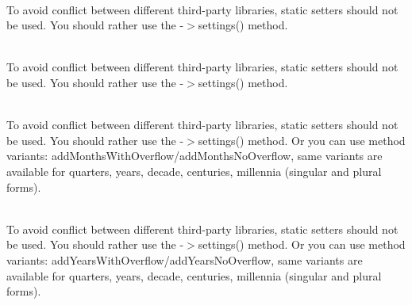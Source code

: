 \begin{DoxyRefList}
\item[Global \doxylink{interface_carbon_1_1_carbon_interface_af30f09ba70e61ee267bee03b2b12ea7c}{Carbon\+Interface\+::disable\+Human\+Diff\+Option} (int \$human\+Diff\+Option)]\hfill \\
\label{deprecated__deprecated000194}%
%
To avoid conflict between different third-\/party libraries, static setters should not be used. You should rather use the -\/\texorpdfstring{$>$}{>}settings() method.  
\item[Global \doxylink{interface_carbon_1_1_carbon_interface_ac7d8c2e90fb7e86be3493973481a1dc0}{Carbon\+Interface\+::enable\+Human\+Diff\+Option} (int \$human\+Diff\+Option)]\hfill \\
\label{deprecated__deprecated000195}%
%
To avoid conflict between different third-\/party libraries, static setters should not be used. You should rather use the -\/\texorpdfstring{$>$}{>}settings() method.  
\item[Global \doxylink{interface_carbon_1_1_carbon_interface_a2b0d16bf4bc86d63d7e68f605398fdab}{Carbon\+Interface\+::reset\+Months\+Overflow} ()]\hfill \\
\label{deprecated__deprecated000196}%
%
To avoid conflict between different third-\/party libraries, static setters should not be used. You should rather use the -\/\texorpdfstring{$>$}{>}settings() method. Or you can use method variants\+: add\+Months\+With\+Overflow/add\+Months\+No\+Overflow, same variants are available for quarters, years, decade, centuries, millennia (singular and plural forms).  
\item[Global \doxylink{interface_carbon_1_1_carbon_interface_a5805d7475fad3039fb8cad16e854b995}{Carbon\+Interface\+::reset\+Years\+Overflow} ()]\hfill \\
\label{deprecated__deprecated000197}%
%
To avoid conflict between different third-\/party libraries, static setters should not be used. You should rather use the -\/\texorpdfstring{$>$}{>}settings() method. Or you can use method variants\+: add\+Years\+With\+Overflow/add\+Years\+No\+Overflow, same variants are available for quarters, years, decade, centuries, millennia (singular and plural forms).  
\item[Global \doxylink{interface_carbon_1_1_carbon_interface_a281bbe0670552c73e105e3c60c65a9bd}{Carbon\+Interface\+::serialize\+Using} (callable\texorpdfstring{$\vert$}{|}string\texorpdfstring{$\vert$}{|}null \$format)]\hfill \\

\end{DoxyRefList}
